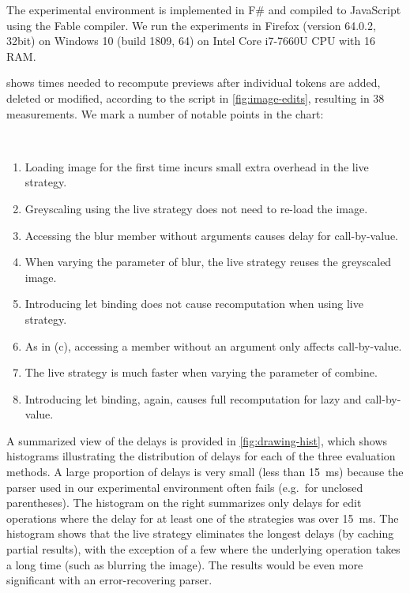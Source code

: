\documentclass[english,crc,references=cleveref]{programming}
\theoremstyle{plain}
\theoremstyle{definition}
\begin{document}

The experimental environment is implemented in F\# and compiled to JavaScript using the Fable
compiler. We run the experiments in Firefox (version 64.0.2, 32bit) on Windows 10
(build 1809, \SI{64}{\bit}) on Intel Core i7-7660U CPU with \SI{16}{\giga\byte} RAM.

 shows times needed to recompute previews after individual tokens
are added, deleted or modified, according to the script in
\cref{fig:image-edits}, resulting in 38 measurements. We mark a number of notable points in the chart:

~

\begin{enumerate}
  \renewcommand{\theenumi}{\alph{enumi}}%
\item Loading image for the first time incurs small extra overhead in the live strategy.
\item Greyscaling using the live strategy does not need to re-load the image.
\item Accessing the blur member without arguments causes delay for call-by-value.
\item When varying the parameter of blur, the live strategy reuses the greyscaled image.
\item Introducing let binding does not cause recomputation when using live strategy.
\item As in (c), accessing a member without an argument only affects call-by-value.
\item The live strategy is much faster when varying the parameter of combine.
\item Introducing let binding, again, causes full recomputation for lazy and call-by-value.
\end{enumerate}
%
%
A summarized view of the delays is provided in \cref{fig:drawing-hist}, which shows
histograms illustrating the distribution of delays for each of the three evaluation methods.
A large proportion of delays is very small (less than \SI{15}{\ms}) because the parser used in our
experimental environment often fails (e.\hairspace g.~for unclosed parentheses). The histogram
on the right summarizes only delays for edit operations where the delay for at least one of
the strategies was over \SI{15}{\ms}. The histogram shows that the live strategy eliminates the longest
delays (by caching partial results), with the exception of a few where the underlying operation
takes a long time (such as blurring the image). The results would be even more significant with
an error-recovering parser.
\end{document}
